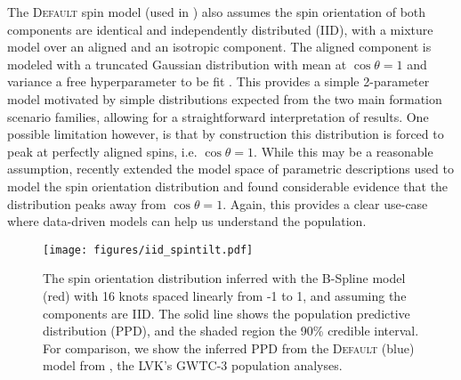 The \textsc{Default} spin model (used in \citet{o3a_pop, o3b_astro_dist}) also assumes the spin orientation of both components are identical and independently distributed (IID), with a mixture model over an
aligned and an isotropic component. The aligned component is modeled with a truncated Gaussian distribution with mean at $\cos{\theta}=1$ and variance a free 
hyperparameter to be fit \citep{Talbot_2017,Wysocki_2019,o3a_pop,o3b_astro_dist}. This provides a simple 2-parameter model motivated by simple distributions expected from the two main formation scenario families, allowing 
for a straightforward interpretation of results. One possible limitation however, is that by construction this distribution is forced to peak at perfectly aligned spins, 
i.e. $\cos{\theta}=1$. While this may be a reasonable assumption, \citet{spinitasyoulike} recently extended the model space of parametric descriptions 
used to model the spin orientation distribution and found considerable evidence that the distribution peaks away from $\cos{\theta}=1$. Again, this provides a clear 
use-case where data-driven models can help us understand the population.

\begin{figure}
    \begin{centering}
        \texttt{[image: figures/iid\_spintilt.pdf]}
        \caption{The spin orientation distribution inferred with the B-Spline model (red) with 16 knots spaced linearly from -1 to 1, and assuming the components are IID. The solid line shows the population predictive distribution (PPD), and the shaded region the 90\% credible interval. 
        For comparison, we show the inferred PPD from the \textsc{Default} (blue) model from \citet{o3b_astro_dist}, the LVK's GWTC-3 population analyses.}
        \label{fig:iid_spintilt_dist}
    \end{centering}
\end{figure}

